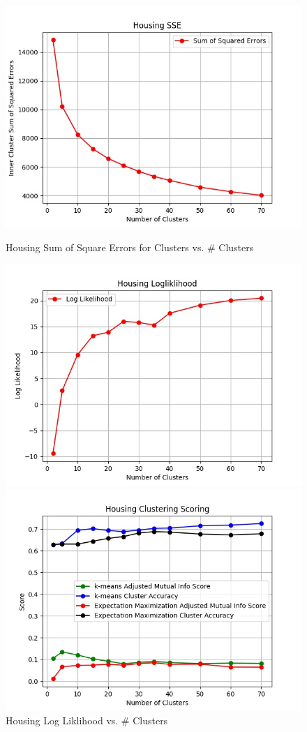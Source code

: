\documentclass[h]{article}
\begin{document}
 \begin{figure}[H]
      \includegraphics[width=1\textwidth,keepaspectratio]{housing_sse.jpg} 
      \caption*{Housing Sum of Square Errors for Clusters vs. \# Clusters} 
   \endminipage\hfill
      \includegraphics[width=1\textwidth,keepaspectratio]{housing_logliklihood.jpg} 
      \caption*{Housing Log Liklihood vs. \# Clusters} 
   \endminipage\hfill
      \includegraphics[width=1\textwidth,keepaspectratio]{housing_clustering_scoring.jpg} 

\end{figure}
\end{document}
